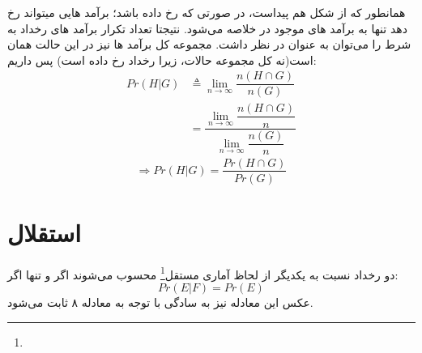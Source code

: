 \documentclass[12pt,onecolumn,a4paper]{article}
\begin{document}
همانطور که از شکل هم پیداست، در صورتی که  رخ داده باشد؛ برآمد هایی میتواند رخ دهد تنها به برآمد های موجود در  خلاصه می‌شود. 
نتیجتا تعداد تکرار برآمد های رخداد  به شرط  را می‌توان به عنوان  در نظر داشت. مجموعه کل برآمد ها نیز در این حالت همان  است(نه کل مجموعه حالات، زیرا رخداد  رخ داده است) پس داریم:
\begin{align*}
    Pr(H|G) &\triangleq \lim_{n\rightarrow\infty} {\dfrac{n(H\cap G)}{n(G)}} \\
    &= \dfrac{\lim_{n\rightarrow\infty}{\dfrac{n(H\cap G)}{n}}} {\lim_{n\rightarrow\infty}{\dfrac{n(G)}{n}}}
\end{align*}
\begin{equation}
     \Rightarrow Pr(H|G) = \dfrac{Pr(H\cap G)}{Pr(G)}
\end{equation}


\section{استقلال}
دو رخداد نسبت به یکدیگر از لحاظ آماری مستقل\footnote{} محسوب می‌شوند اگر و تنها اگر:
\begin{equation}
    Pr(E|F) = Pr(E)
\end{equation}
عکس این معادله نیز به سادگی با توجه به معادله ۸ ثابت می‌شود.
\end{document}
